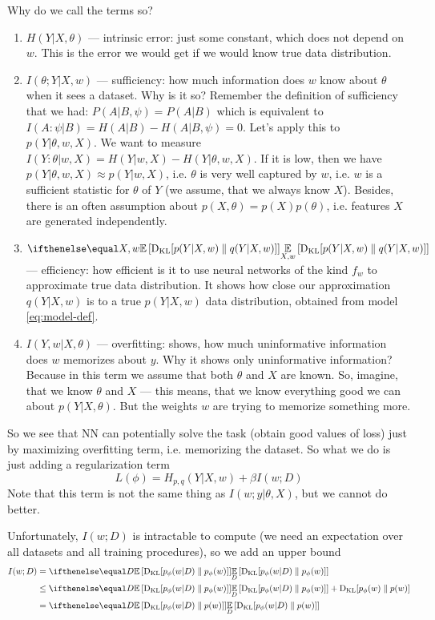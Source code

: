 \documentclass{article}
\begin{document}
Why do we call the terms so?
\begin{enumerate}
    \item $H(Y|X,\theta)$ --- intrinsic error: just some constant, which does not depend on $w$. This is the error we would get if we would know true data distribution.
    \item $I(\theta; Y | X,w)$ --- sufficiency: how much information does $w$ know about $\theta$ when it sees a dataset. Why is it so? Remember the definition of sufficiency that we had: $P(A|B,\psi) = P(A|B)$ which is equivalent to $I(A : \psi |B ) = H(A | B) - H(A | B, \psi) = 0$. Let's apply this to $p(Y|\theta, w, X)$. We want to measure $I(Y:\theta | w, X) = H(Y | w, X) - H(Y | \theta, w, X)$. If it is low, then we have $p(Y | \theta, w, X) \approx p(Y | w, X)$, i.e. $\theta$ is very well captured by $w$, i.e. $w$ is a sufficient statistic for $\theta$ of $Y$ (we assume, that we always know $X$). Besides, there is an often assumption about $p(X,\theta) = p(X)p(\theta)$, i.e. features $X$ are generated independently.
    \item $\expect[X,w]{\kl{p(Y|X,w)}{q(Y|X,w)}}$ --- efficiency: how efficient is it to use neural networks of the kind $f_w$ to approximate true data distribution. It shows how close our approximation $q(Y|X,w)$ is to a true $p(Y|X,w)$ data distribution, obtained from model \eqref{eq:model-def}.
    \item $I(Y,w|X,\theta)$ --- overfitting: shows, how much uninformative information does $w$ memorizes about $y$. Why it shows only uninformative information? Because in this term we assume that both $\theta$ and $X$ are known. So, imagine, that we know $\theta$ and $X$ --- this means, that we know everything good we can about $p(Y|X,\theta)$. But the weights $w$ are trying to memorize something more.
\end{enumerate}

So we see that NN can potentially solve the task (obtain good values of loss) just by maximizing overfitting term, i.e. memorizing the dataset.
So what we do is just adding a regularization term
\[
L(\phi) = H_{p,q}(Y|X,w) + \beta I(w;D)
\]
Note that this term is not the same thing as $I(w;y|\theta, X)$, but we cannot do better.

Unfortunately, $I(w;D)$ is intractable to compute (we need an expectation over all datasets and all training procedures), so we add an upper bound
\begin{equation}
\begin{split}
I(w; D) &= \expect[D]{\kl{p_\phi(w|D)}{p_\phi(w)}}
\\
&\leq \expect[D]{\kl{p_\phi(w|D)}{p_\phi(w)}} + \kl{p_\phi(w)}{p(w)}
\\
&= \expect[D]{\kl{p_\phi(w|D)}{p(w)}}
\end{split}
\end{equation}
\end{document}
